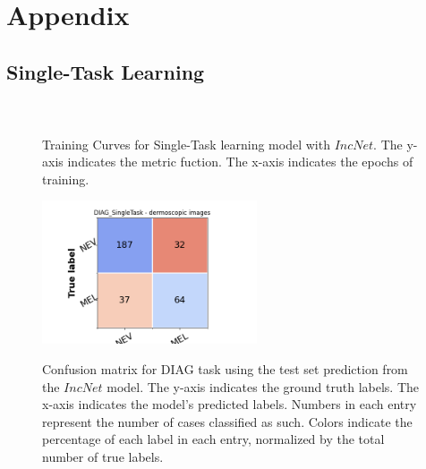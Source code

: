 \graphicspath{{chapters/chapter7/}}
\chapter{Appendix} \label{chapter7}
\section{Single-Task Learning}
\subsection{\texorpdfstring{}{TEXT}}
\label{IncNet}
\begin{figure}[ht]
\\
\caption{Training Curves for Single-Task learning model with $IncNet$. The y-axis indicates the metric fuction. The x-axis indicates the epochs of training.}
\label{incNettraining}
\end{figure}
\begin{figure}[ht]
\centering
{\includegraphics[width =2.5in]{images/appendice/stl/incnet/DIAG_CM_SingleTask.png}}
\caption{Confusion matrix for DIAG task using the test set prediction
from the $IncNet$ model. The y-axis indicates the ground truth labels. The x-axis indicates the model’s predicted labels. Numbers in each entry represent
the number of cases classified as such. Colors indicate the percentage of each
label in each entry, normalized by the total number of true labels.}
\label{incNetCM}
\end{figure}
\clearpage
